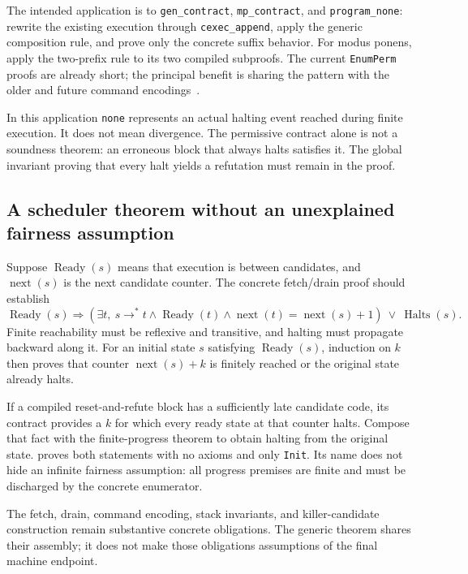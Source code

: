 \documentclass[11pt,letterpaper]{article}
\newcommand{\code}[1]{\texttt{\small #1}}
\newcommand{\Reach}{\mathrel{\longrightarrow^{*}}}
\begin{document}
The intended application is to \code{gen\_contract}, \code{mp\_contract}, and
\code{program\_none}: rewrite the existing execution through \code{cexec\_append},
apply the generic composition rule, and prove only the concrete suffix behavior.
For modus ponens, apply the two-prefix rule to its two compiled subproofs. The current
\code{EnumPerm} proofs are already short; the principal benefit is sharing the pattern
with the older and future command encodings~\cite{enumerator}.

In this application \code{none} represents an actual halting event reached during
finite execution. It does not mean divergence. The permissive contract alone is not
a soundness theorem: an erroneous block that always halts satisfies it. The global
invariant proving that every halt yields a refutation must remain in the proof.

\subsection{A scheduler theorem without an unexplained fairness assumption}

Suppose \(\operatorname{Ready}(s)\) means that execution is between candidates, and
\(\operatorname{next}(s)\) is the next candidate counter. The concrete fetch/drain
proof should establish
\[
 \operatorname{Ready}(s)\Longrightarrow
 \left(\exists t,\ s\Reach t\land\operatorname{Ready}(t)
          \land\operatorname{next}(t)=\operatorname{next}(s)+1\right)
 \ \lor\ \operatorname{Halts}(s).
\]
Finite reachability must be reflexive and transitive, and halting must propagate
backward along it. For an initial state \(s\) satisfying \(\operatorname{Ready}(s)\),
induction on \(k\) then proves that counter
\(\operatorname{next}(s)+k\) is finitely reached or the original state already halts.

If a compiled reset-and-refute block has a sufficiently late candidate code, its
contract provides a \(k\) for which every ready state at that counter halts. Compose
that fact with the finite-progress theorem to obtain halting from the original state.
 proves both statements with no axioms and only
\code{Init}. Its name does not hide an infinite fairness assumption: all progress
premises are finite and must be discharged by the concrete enumerator.

The fetch, drain, command encoding, stack invariants, and killer-candidate construction
remain substantive concrete obligations. The generic theorem shares their assembly;
it does not make those obligations assumptions of the final machine endpoint.
\end{document}
